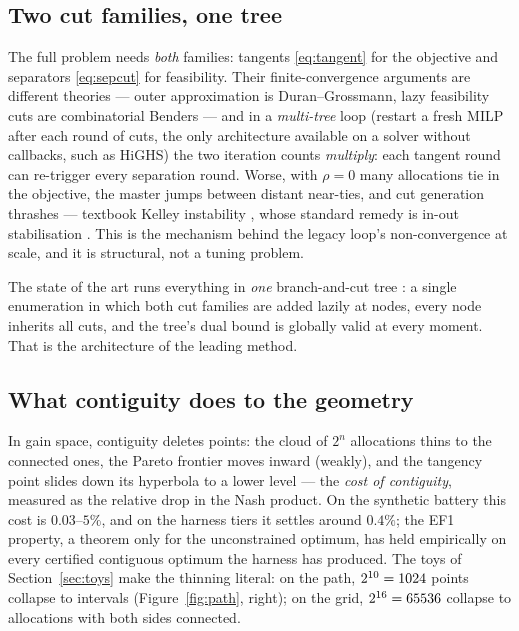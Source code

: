 \documentclass[11pt]{article}
\theoremstyle{definition}
\begin{document}
\subsection{Two cut families, one tree}\label{sec:onetree}

The full problem needs \emph{both} families: tangents \eqref{eq:tangent} for the
objective and separators \eqref{eq:sepcut} for feasibility. Their finite-convergence
arguments are different theories --- outer approximation is Duran--Grossmann, lazy
feasibility cuts are combinatorial Benders \citep{hooker2003,codato2006} --- and in a
\emph{multi-tree} loop (restart a fresh MILP after each round of cuts, the only
architecture available on a solver without callbacks, such as HiGHS) the two iteration
counts \emph{multiply}: each tangent round can re-trigger every separation round.
Worse, with $\rho=0$ many allocations tie in the objective, the master jumps between
distant near-ties, and cut generation thrashes --- textbook Kelley instability
\citep{lemarechal1995}, whose standard remedy is in-out stabilisation
\citep{benameur2007,fischettisalvagnin2010}. This is the mechanism behind the legacy
loop's non-convergence at scale, and it is structural, not a tuning problem.

The state of the art runs everything in \emph{one} branch-and-cut tree
\citep{quesada1992,bonami2008,kronqvist2018,validi2021}: a single enumeration in which
both cut families are added lazily at nodes, every node inherits all cuts, and the
tree's dual bound is globally valid at every moment. That is the architecture of the
leading method.

\subsection{What contiguity does to the geometry}

In gain space, contiguity deletes points: the cloud of $2^n$ allocations thins to the
connected ones, the Pareto frontier moves inward (weakly), and the tangency point slides
down its hyperbola to a lower level --- the \emph{cost of contiguity}, measured as the
relative drop in the Nash product. On the synthetic battery this cost is $0.03$--$5\%$,
and on the harness tiers it settles around $0.4\%$; the EF1 property, a theorem only for
the unconstrained optimum, has held empirically on every certified contiguous optimum
the harness has produced. The toys of Section~\ref{sec:toys} make the thinning literal:
on the path, $2^{10}=1024$ points collapse to \pathIntervals{} intervals
(Figure~\ref{fig:path}, right); on the grid, $2^{16}=65536$ collapse to
\gridFeasible{} allocations with both sides connected.
\end{document}
